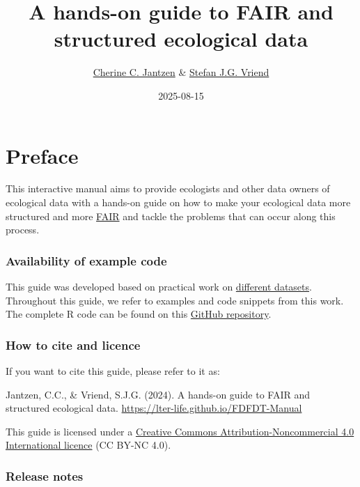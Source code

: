 \documentclass[
]{book}
\title{A hands-on guide to FAIR and structured ecological data}
\author{\href{https://orcid.org/0009-0006-0723-2682}{Cherine C. Jantzen} \& \href{http://orcid.org/0000-0002-9006-5988}{Stefan J.G. Vriend}}
\date{2025-08-15}
\begin{document}
\maketitle

{
\setcounter{tocdepth}{1}
\tableofcontents
}
\hypertarget{preface}{%
\chapter*{Preface}\label{preface}}

This interactive manual aims to provide ecologists and other data owners of ecological data with a hands-on guide on how to make your ecological data more structured and more \protect\hyperlink{FAIR}{FAIR} and tackle the problems that can occur along this process.

\hypertarget{availability-of-example-code}{%
\subsection*{Availability of example code}\label{availability-of-example-code}}

This guide was developed based on practical work on \protect\hyperlink{example-datasets}{different datasets}. Throughout this guide, we refer to examples and code snippets from this work. The complete R code can be found on this \href{https://github.com/LTER-LIFE/FDFDT}{GitHub repository}.

\hypertarget{how-to-cite-and-licence}{%
\subsection*{How to cite and licence}\label{how-to-cite-and-licence}}

If you want to cite this guide, please refer to it as:

Jantzen, C.C., \& Vriend, S.J.G. (2024). A hands-on guide to FAIR and structured ecological data. \url{https://lter-life.github.io/FDFDT-Manual}

This guide is licensed under a \href{https://creativecommons.org/licenses/by-nc/4.0/}{Creative Commons Attribution-Noncommercial 4.0 International licence} (CC BY-NC 4.0). \href{images/CCBY-NC_logo.png}{}

\hypertarget{release-notes}{%
\subsection*{Release notes}\label{release-notes}}
\end{document}
